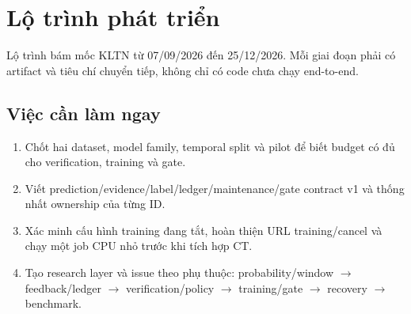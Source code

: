 \section{Lộ trình phát triển}

Lộ trình bám mốc KLTN từ 07/09/2026 đến 25/12/2026. Mỗi giai đoạn phải có artifact và tiêu chí chuyển tiếp, không chỉ có code chưa chạy end-to-end.

\subsection{Việc cần làm ngay}

\begin{enumerate}
  \item Chốt hai dataset, model family, temporal split và pilot để biết budget có đủ cho verification, training và gate.
  \item Viết prediction/evidence/label/ledger/maintenance/gate contract v1 và thống nhất ownership của từng ID.
  \item Xác minh cấu hình training đang tắt, hoàn thiện URL training/cancel và chạy một job CPU nhỏ trước khi tích hợp CT.
  \item Tạo research layer và issue theo phụ thuộc: probability/window \(\rightarrow\) feedback/ledger \(\rightarrow\) verification/policy \(\rightarrow\) training/gate \(\rightarrow\) recovery \(\rightarrow\) benchmark.
\end{enumerate}

